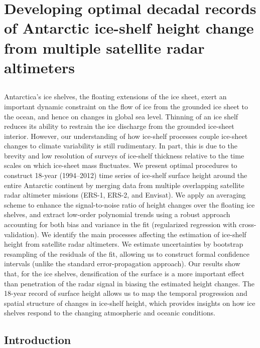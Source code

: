 %
%

\chapter{Developing optimal decadal records of Antarctic ice-shelf height change from multiple satellite radar altimeters}


\section*{}
\noindent
Antarctica's ice shelves, the floating extensions of the ice sheet, exert an important dynamic constraint on the flow of ice from the grounded ice sheet to the ocean, and hence on changes in global sea level. Thinning of an ice shelf reduces its ability to restrain the ice discharge from the grounded ice-sheet interior. However, our understanding of how ice-shelf processes couple ice-sheet changes to climate variability is still rudimentary. In part, this is due to the brevity and low resolution of surveys of ice-shelf thickness relative to the time scales on which ice-sheet mass fluctuates. We present optimal procedures to construct 18-year (1994--2012) time series of ice-shelf surface height around the entire Antarctic continent by merging data from multiple overlapping satellite radar altimeter missions (ERS-1, ERS-2, and Envisat). We apply an averaging scheme to enhance the signal-to-noise ratio of height changes over the floating ice shelves, and extract low-order polynomial trends using a robust approach accounting for both bias and variance in the fit (regularized regression with cross-validation). We identify the main processes affecting the estimation of ice-shelf height from satellite radar altimeters. We estimate uncertainties by bootstrap resampling of the residuals of the fit, allowing us to construct formal confidence intervals (unlike the standard error-propagation approach). Our results show that, for the ice shelves, densification of the surface is a more important effect than penetration of the radar signal in biasing the estimated height changes. The 18-year record of surface height allows us to map the temporal progression and spatial structure of changes in ice-shelf height, which provides insights on how ice shelves respond to the changing atmospheric and oceanic conditions.

\section{Introduction}

